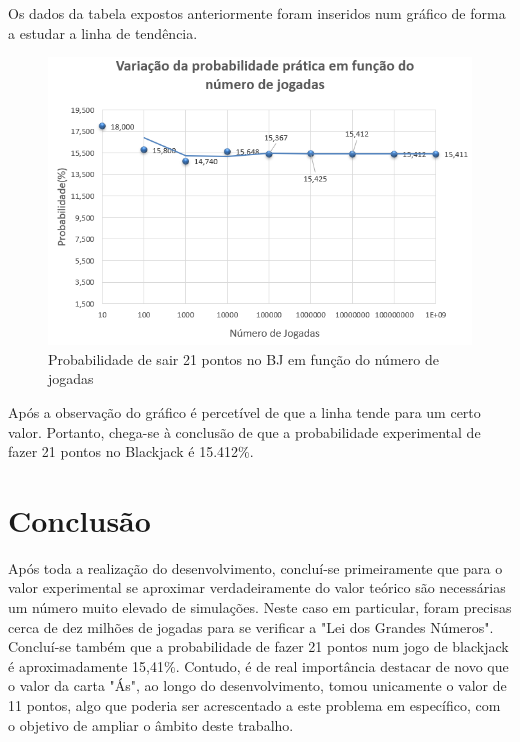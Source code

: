 \documentclass{report}
\begin{document}
Os dados da tabela expostos anteriormente foram inseridos num gráfico de forma a estudar a linha de tendência.
\begin{figure}[H]
\center
\includegraphics[scale=0.45]{fotos/1.png}
\caption{Probabilidade de sair 21 pontos no BJ em função do número de jogadas}
\end{figure}

Após a observação do gráfico é percetível de que a linha tende para um certo valor. Portanto, chega-se à conclusão de que a probabilidade experimental de fazer 21 pontos no Blackjack é 15.412\%.

\chapter{Conclusão}
\label{chap.conclusao}
Após toda a realização do desenvolvimento, concluí-se primeiramente que para o valor experimental se aproximar verdadeiramente do valor teórico são necessárias um número muito elevado de simulações. Neste caso em particular, foram precisas cerca de dez milhões de jogadas para se verificar a "Lei dos Grandes Números". Concluí-se também que a probabilidade de fazer 21 pontos num jogo de blackjack é aproximadamente 15,41\%. Contudo, é de real importância destacar de novo que o valor da carta "Ás", ao longo do desenvolvimento, tomou unicamente o valor de 11 pontos, algo que poderia ser acrescentado a este problema em específico, com o objetivo de ampliar o âmbito deste trabalho.

\end{document}
